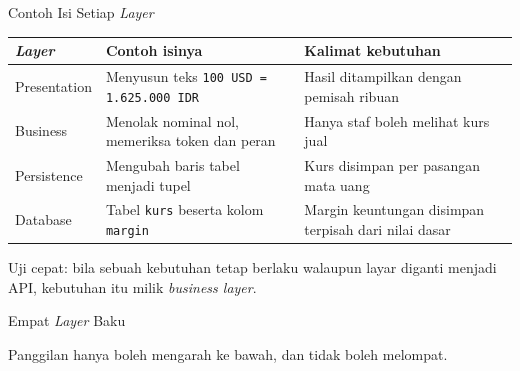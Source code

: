 \documentclass[aspectratio=169, table, 12pt]{beamer}
\begin{document}
\begin{frame}{{\Large Contoh Isi Setiap \textit{Layer}}}
  \vspace{6pt}
  \centering
  \small
  \begin{tabularx}{0.97\textwidth}{|l|X|X|}
    \hline
    \textbf{\textit{Layer}} & \textbf{Contoh isinya} & \textbf{Kalimat kebutuhan} \\
    \hline
    Presentation & Menyusun teks \texttt{100 USD = 1.625.000 IDR} & Hasil ditampilkan dengan pemisah ribuan \\
    \hline
    Business & Menolak nominal nol, memeriksa token dan peran & Hanya staf boleh melihat kurs jual \\
    \hline
    Persistence & Mengubah baris tabel menjadi tupel & Kurs disimpan per pasangan mata uang \\
    \hline
    Database & Tabel \texttt{kurs} beserta kolom \texttt{margin} & Margin keuntungan disimpan terpisah dari nilai dasar \\
    \hline
  \end{tabularx}

  \vspace{10pt}
  {\small Uji cepat: bila sebuah kebutuhan tetap berlaku walaupun layar diganti
  menjadi API, kebutuhan itu milik \textit{business layer}.}
\end{frame}

\begin{frame}{{\Large Empat \textit{Layer} Baku}}
  \vspace{5pt}
  \centering

  \vspace{8pt}
  {\small Panggilan hanya boleh mengarah ke bawah, dan tidak boleh melompat.}
\end{frame}
\end{document}
